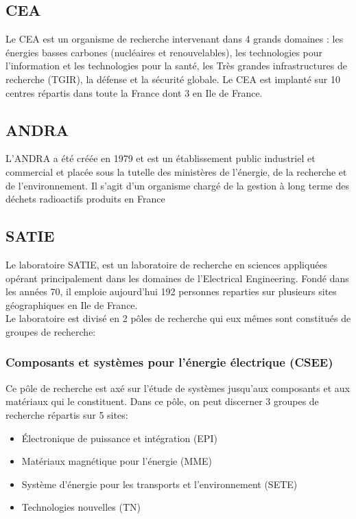 \subsection{CEA}
Le CEA\cite{ref2} est un organisme de recherche intervenant dans 4 grands domaines : les énergies basses carbones (nucléaires et renouvelables), les technologies pour l'information et les technologies pour la santé, les Très grandes infrastructures de recherche (TGIR), la défense et la sécurité globale. Le CEA est implanté sur 10 centres répartis dans toute la France dont 3 en Ile de France.\\
\subsection{ANDRA}
L'ANDRA\cite{ref3} a été créée en 1979 et est un établissement public industriel et commercial et placée sous la tutelle des ministères de l'énergie, de la recherche et de l'environnement. Il s'agit d'un organisme chargé de la gestion à long terme des déchets radioactifs produits en France
\subsection{SATIE}
Le laboratoire SATIE\cite{ref1}, est un laboratoire de recherche en sciences appliquées opérant principalement dans les domaines de l'Electrical Engineering. Fondé dans les années 70, il emploie aujourd'hui 192 personnes reparties sur plusieurs sites géographiques en Ile de France. \\
Le laboratoire est divisé en 2 pôles de recherche qui eux mêmes sont constitués de groupes de recherche:
\subsubsection{Composants et systèmes pour l'énergie électrique (CSEE)}
Ce pôle de recherche est axé sur l'étude de systèmes jusqu'aux composants et aux matériaux qui le constituent. Dans ce pôle, on peut discerner 3 groupes de recherche répartis sur 5 sites:\\
\begin{itemize}
\item Électronique de puissance et intégration (EPI)
\item Matériaux magnétique pour l'énergie (MME)
\item Système d'énergie pour les transports et l'environnement (SETE)
\item Technologies nouvelles (TN)
\end{itemize}
